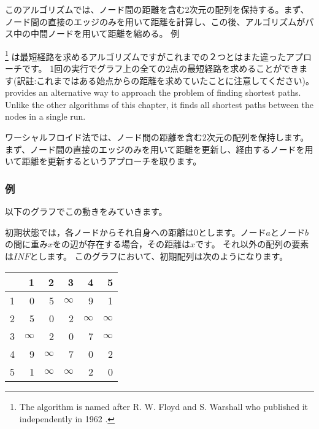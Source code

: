 
このアルゴリズムでは、ノード間の距離を含む2次元の配列を保持する。まず、ノード間の直接のエッジのみを用いて距離を計算し、この後、アルゴリズムがパス中の中間ノードを用いて距離を縮める。
例

\footnote{The algorithm
is named after R. W. Floyd and S. Warshall
who published it independently in 1962 \cite{flo62,war62}.}
は最短経路を求めるアルゴリズムですがこれまでの２つとはまた違ったアプローチです。
1回の実行でグラフ上の全ての2点の最短経路を求めることができます(訳註:これまではある始点からの距離を求めていたことに注意してください)。
provides an alternative way to approach the problem
of finding shortest paths.
Unlike the other algorithms of this chapter,
it finds all shortest paths between the nodes
in a single run.


ワーシャルフロイド法では、ノード間の距離を含む2次元の配列を保持します。
まず、ノード間の直接のエッジのみを用いて距離を更新し、経由するノードを用いて距離を更新するというアプローチを取ります。

\subsubsection{例}
以下のグラフでこの動きをみていきます。

\begin{center}
\end{center}

初期状態では，各ノードからそれ自身への距離は$0$とします。ノード$a$とノード$b$の間に重み$x$をの辺が存在する場合，その距離は$x$です。
それ以外の配列の要素は$INF$とします。
このグラフにおいて、初期配列は次のようになります。

\begin{center}
\begin{tabular}{r|rrrrr}
 & 1 & 2 & 3 & 4 & 5 \\
\hline
1 & 0 & 5 & $\infty$ & 9 & 1 \\
2 & 5 & 0 & 2 & $\infty$ & $\infty$ \\
3 & $\infty$ & 2 & 0 & 7 & $\infty$ \\
4 & 9 & $\infty$ & 7 & 0 & 2 \\
5 & 1 & $\infty$ & $\infty$ & 2 & 0 \\
\end{tabular}
\end{center}
\vspace{10pt}

